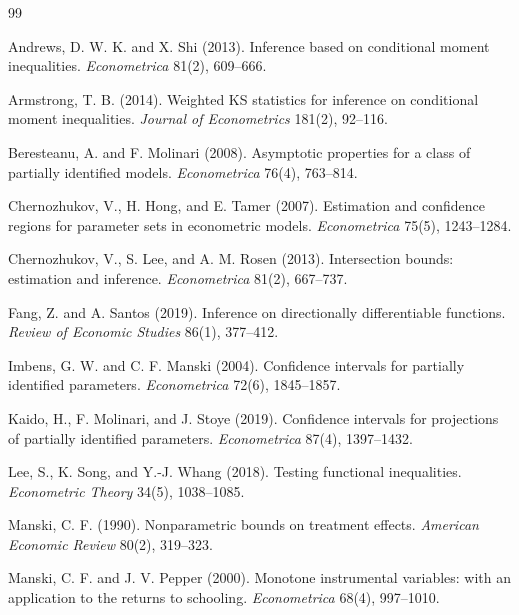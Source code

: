 \documentclass[11pt]{article}
\theoremstyle{definition}
\theoremstyle{plain}
\theoremstyle{remark}
\begin{document}
\begin{thebibliography}{99}

Andrews, D. W. K. and X. Shi (2013).
Inference based on conditional moment inequalities.
\emph{Econometrica} 81(2), 609--666.

Armstrong, T. B. (2014).
Weighted KS statistics for inference on conditional moment inequalities.
\emph{Journal of Econometrics} 181(2), 92--116.

Beresteanu, A. and F. Molinari (2008).
Asymptotic properties for a class of partially identified models.
\emph{Econometrica} 76(4), 763--814.

Chernozhukov, V., H. Hong, and E. Tamer (2007).
Estimation and confidence regions for parameter sets in econometric models.
\emph{Econometrica} 75(5), 1243--1284.

Chernozhukov, V., S. Lee, and A. M. Rosen (2013).
Intersection bounds: estimation and inference.
\emph{Econometrica} 81(2), 667--737.

Fang, Z. and A. Santos (2019).
Inference on directionally differentiable functions.
\emph{Review of Economic Studies} 86(1), 377--412.

Imbens, G. W. and C. F. Manski (2004).
Confidence intervals for partially identified parameters.
\emph{Econometrica} 72(6), 1845--1857.

Kaido, H., F. Molinari, and J. Stoye (2019).
Confidence intervals for projections of partially identified parameters.
\emph{Econometrica} 87(4), 1397--1432.

Lee, S., K. Song, and Y.-J. Whang (2018).
Testing functional inequalities.
\emph{Econometric Theory} 34(5), 1038--1085.

Manski, C. F. (1990).
Nonparametric bounds on treatment effects.
\emph{American Economic Review} 80(2), 319--323.

Manski, C. F. and J. V. Pepper (2000).
Monotone instrumental variables: with an application to the returns to schooling.
\emph{Econometrica} 68(4), 997--1010.

\end{thebibliography}
\end{document}
